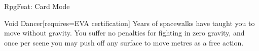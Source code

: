 \begin{ExampleBlock}{RpgFeat: Card Mode}
\begin{RpgFeat}[width=5cm, height=6cm]{Void Dancer}[requires={EVA certification}]
    Years of spacewalks have taught you to move without gravity. You suffer no penalties for fighting in zero gravity, and once per scene you may push off any surface to move  metres as a free action.
\end{RpgFeat}

\end{ExampleBlock}

